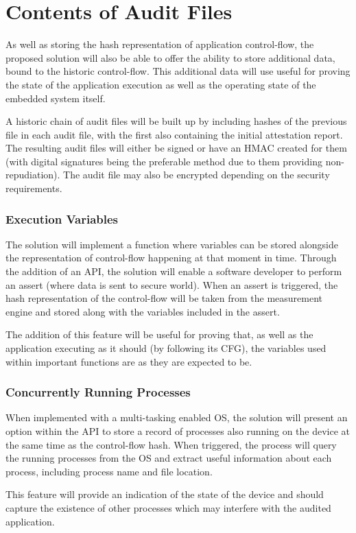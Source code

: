 \section{Contents of Audit Files}

As well as storing the hash representation of application control-flow, the proposed solution will also be able to offer the ability to store additional data, bound to the historic control-flow. This additional data will use useful for proving the state of the application execution as well as the operating state of the embedded system itself.

A historic chain of audit files will be built up by including hashes of the previous file in each audit file, with the first also containing the initial attestation report. The resulting audit files will either be signed or have an HMAC created for them (with digital signatures being the preferable method due to them providing non-repudiation). The audit file may also be encrypted depending on the security requirements. 

\subsubsection*{Execution Variables}

The solution will implement a function where variables can be stored alongside the representation of control-flow happening at that moment in time. Through the addition of an API, the solution will enable a software developer to perform an assert (where data is sent to secure world). When an assert is triggered, the hash representation of the control-flow will be taken from the measurement engine and stored along with the variables included in the assert.

The addition of this feature will be useful for proving that, as well as the application executing as it should (by following its CFG), the variables used within important functions are as they are expected to be.

\subsubsection*{Concurrently Running Processes}

When implemented with a multi-tasking enabled OS, the solution will present an option within the API to store a record of processes also running on the device  at the same time as the control-flow hash. When triggered, the process will query the running processes from the OS and extract useful information about each process, including process name and file location.

This feature will provide an indication of the state of the device and should capture the existence of other processes which may interfere with the audited application. 
